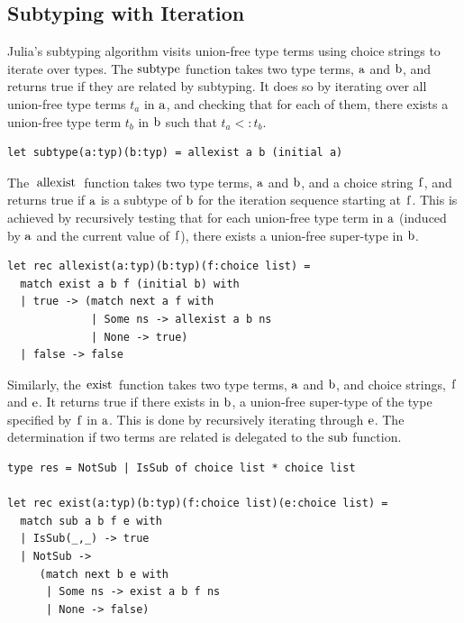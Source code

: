 \documentclass[a4paper,english]{lipics-v2019}
\renewcommand{\c}[1]{\ensuremath{\text{\lstinline{#1}}}\xspace}
\begin{document}
\subsection{Subtyping with Iteration}

Julia's subtyping algorithm visits union-free type terms using choice
strings to iterate over types. The \c{subtype} function takes two type
terms, \c a and \c b, and returns true if they are related by
subtyping. It does so by iterating over all union-free type terms $t_a$ in \c a,
and checking that for each of them, there exists a union-free type term $t_b$ in
\c b such that $t_a <: t_b$.

\begin{lstlisting}
let subtype(a:typ)(b:typ) = allexist a b (initial a)
\end{lstlisting}

\noindent
The \c{allexist} function takes two type terms, \c a and \c b, and a choice
string \c f, and returns true if \c a is a subtype of \c b for the iteration
sequence starting at \c f. This is achieved by recursively testing that for
each union-free type term in \c a (induced by \c a and the current value of
\c f), there exists a union-free super-type in \c b.

\newpage
\begin{lstlisting}
let rec allexist(a:typ)(b:typ)(f:choice list) =
  match exist a b f (initial b) with 
  | true -> (match next a f with
             | Some ns -> allexist a b ns 
             | None -> true) 
  | false -> false
\end{lstlisting}

\noindent
Similarly, the \c{exist} function takes two type terms, \c a and \c b, and
choice strings, \c f and \c e. It returns true if there exists in \c b, a
union-free super-type of the type specified by \c f in \c a. This is done by
recursively iterating through \c e. The determination if two terms are
related is delegated to the \c{sub} function.

\begin{lstlisting}
type res = NotSub | IsSub of choice list * choice list

let rec exist(a:typ)(b:typ)(f:choice list)(e:choice list) =
  match sub a b f e with 
  | IsSub(_,_) -> true 
  | NotSub -> 
     (match next b e with
      | Some ns -> exist a b f ns 
      | None -> false) 
\end{lstlisting}
\end{document}
